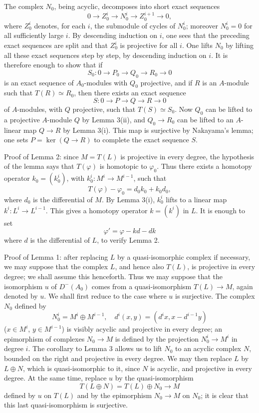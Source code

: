 \documentclass[11pt]{article}
\begin{document}
The complex $N_0$, being acyclic, decomposes into short exact sequences
\[
0\longrightarrow Z_0^i\longrightarrow N_0^i\longrightarrow Z_0^{i+1}\longrightarrow0,
\]
where $Z_0^i$ denotes, for each $i$, the submodule of cycles of $N_0^i$; moreover $N_0^i=0$ for all sufficiently large $i$. By descending induction on $i$, one sees that the preceding exact sequences are split and that $Z_0^i$ is projective for all $i$. One lifts $N_0$ by lifting all these exact sequences step by step, by descending induction on $i$. It is therefore enough to show that if
\[
S_0:0\longrightarrow P_0\longrightarrow Q_0\longrightarrow R_0\longrightarrow0
\]
is an exact sequence of $A_0$-modules with $Q_0$ projective, and if $R$ is an $A$-module such that $T(R)\simeq R_0$, then there exists an exact sequence
\[
S:0\longrightarrow P\longrightarrow Q\longrightarrow R\longrightarrow0
\]
of $A$-modules, with $Q$ projective, such that $T(S)\simeq S_0$. Now $Q_0$ can be lifted to a projective $A$-module $Q$ by Lemma 3(ii), and $Q_0\to R_0$ can be lifted to an $A$-linear map $Q\to R$ by Lemma 3(i). This map is surjective by Nakayama's lemma; one sets $P=\ker(Q\to R)$ to complete the exact sequence $S$.

Proof of Lemma 2: since $M=T(L)$ is projective in every degree, the hypothesis of the lemma says that $T(\varphi)$ is homotopic to $\varphi_0$. Thus there exists a homotopy operator $k_0=(k_0^i)$, with $k_0^i:M^i\to M^{i-1}$, such that
\[
T(\varphi)-\varphi_0=d_0k_0+k_0d_0,
\]
where $d_0$ is the differential of $M$. By Lemma 3(i), $k_0^i$ lifts to a linear map $k^i:L^i\to L^{i-1}$. This gives a homotopy operator $k=(k^i)$ in $L$. It is enough to set
\[
\varphi'=\varphi-kd-dk
\]
where $d$ is the differential of $L$, to verify Lemma 2.

Proof of Lemma 1: after replacing $L$ by a quasi-isomorphic complex if necessary, we may suppose that the complex $L$, and hence also $T(L)$, is projective in every degree; we shall assume this henceforth. Thus we may suppose that the isomorphism $u$ of $D^-(A_0)$ comes from a quasi-isomorphism $T(L)\to M$, again denoted by $u$. We shall first reduce to the case where $u$ is surjective. The complex $N_0$ defined by
\[
N_0^i=M^i\oplus M^{i-1},
\quad
 d^i(x,y)=(d^i x,x-d^{i-1}y)
\]
($x\in M^i$, $y\in M^{i-1}$) is visibly acyclic and projective in every degree; an epimorphism of complexes $N_0\to M$ is defined by the projection $N_0^i\to M^i$ in degree $i$. The corollary to Lemma 3 allows us to lift $N_0$ to an acyclic complex $N$, bounded on the right and projective in every degree. We may then replace $L$ by $L\oplus N$, which is quasi-isomorphic to it, since $N$ is acyclic, and projective in every degree. At the same time, replace $u$ by the quasi-isomorphism
\[
T(L\oplus N)=T(L)\oplus N_0\longrightarrow M
\]
defined by $u$ on $T(L)$ and by the epimorphism $N_0\to M$ on $N_0$; it is clear that this last quasi-isomorphism is surjective.
\end{document}
